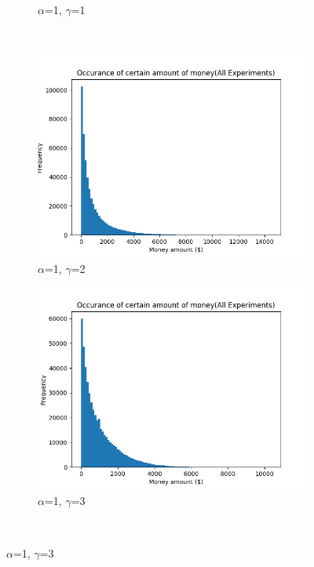 \documentclass[12pt]{article} %
\begin{document}
\begin{figure}[h!]
\begin{subfigure}{\scaleTextWidth\textwidth}
		\caption{$\alpha$=1, $\gamma$=1}
		\label{fig:a1g1}
	\end{subfigure}\\[1ex] %
	\begin{subfigure}{\scaleTextWidth\textwidth}
		\includegraphics[scale=\scaleResultsA]{a1g2.png}
		\caption{$\alpha$=1, $\gamma$=2}
		\label{fig:a1g2}
	\end{subfigure}
	\begin{subfigure}{\scaleTextWidth\textwidth}
		\includegraphics[scale=\scaleResultsA]{a1g3.png}
		\caption{$\alpha$=1, $\gamma$=3}
		\label{fig:a1g3}
	\end{subfigure}\\[1ex]

\end{figure}
\end{document}
